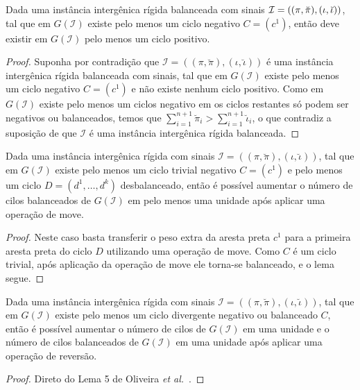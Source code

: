 \begin{lemma}\label{lemma:UXFNYAGI}
Dada uma instância intergênica rígida balanceada com sinais $\mathcal{I}=((\pi,\breve\pi),\break(\iota,\breve\iota))$, tal que em $G(\mathcal{I})$ existe pelo menos um ciclo negativo $C=(c^1)$, então deve existir em $G(\mathcal{I})$ pelo menos um ciclo positivo.
\end{lemma}
\begin{proof}
Suponha por contradição que $\mathcal{I}=((\pi,\breve\pi),(\iota,\breve\iota))$ é uma instância intergênica rígida balanceada com sinais, tal que em $G(\mathcal{I})$ existe pelo menos um ciclo negativo $C=(c^1)$ e não existe nenhum ciclo positivo. Como em $G(\mathcal{I})$ existe pelo menos um ciclos negativo em os ciclos restantes só podem ser negativos ou balanceados, temos que $\sum_{i=1}^{n+1}\breve\pi_i > \sum_{i=1}^{n+1}\breve\iota_i$, o que contradiz a suposição de que $\mathcal{I}$ é uma instância intergênica rígida balanceada.
\end{proof}

\begin{lemma}\label{lemma:NTNBEHIO}
Dada uma instância intergênica rígida com sinais $\mathcal{I}=((\pi,\breve\pi),(\iota,\breve\iota))$, tal que em $G(\mathcal{I})$ existe pelo menos um ciclo trivial negativo $C=(c^1)$ e pelo menos um ciclo $D=(d^1,\dots,d^k)$ desbalanceado, então é possível aumentar o número de cilos balanceados de $G(\mathcal{I})$ em pelo menos uma unidade após aplicar uma operação de move.
\end{lemma}
\begin{proof}
Neste caso basta transferir o peso extra da aresta preta $c^1$ para a primeira aresta preta do ciclo $D$ utilizando uma operação de move. Como $C$ é um ciclo trivial, após aplicação da operação de move ele torna-se balanceado, e o lema segue.
\end{proof}

\begin{lemma}\label{lemma:IWIAXMBS}
Dada uma instância intergênica rígida com sinais $\mathcal{I}=((\pi,\breve\pi),(\iota,\breve\iota))$, tal que em $G(\mathcal{I})$ existe pelo menos um ciclo divergente negativo ou balanceado $C$, então é possível aumentar o número de cilos de $G(\mathcal{I})$ em uma unidade e o número de cilos balanceados de $G(\mathcal{I})$ em uma unidade após aplicar uma operação de reversão.
\end{lemma}
\begin{proof}
Direto do Lema 5 de Oliveira \textit{et al.}~\cite{2021b-oliveira-etal}.
\end{proof}

